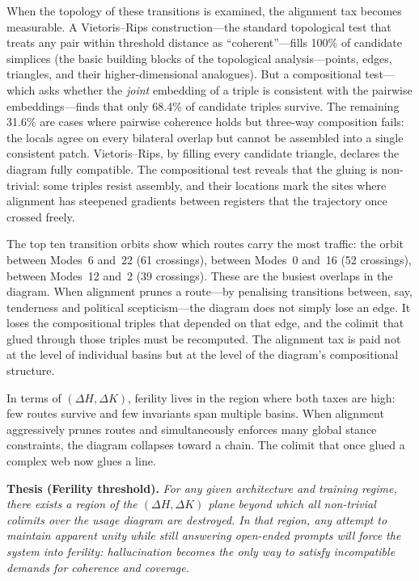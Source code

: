 When the topology of these transitions is examined, the alignment tax becomes measurable. A Vietoris--Rips construction---the standard topological test that treats any pair within threshold distance as ``coherent''---fills 100\% of candidate simplices (the basic building blocks of the topological analysis---points, edges, triangles, and their higher-dimensional analogues). But a compositional test---which asks whether the \emph{joint} embedding of a triple is consistent with the pairwise embeddings---finds that only 68.4\% of candidate triples survive. The remaining 31.6\% are cases where pairwise coherence holds but three-way composition fails: the locals agree on every bilateral overlap but cannot be assembled into a single consistent patch. Vietoris--Rips, by filling every candidate triangle, declares the diagram fully compatible. The compositional test reveals that the gluing is non-trivial: some triples resist assembly, and their locations mark the sites where alignment has steepened gradients between registers that the trajectory once crossed freely.

The top ten transition orbits show which routes carry the most traffic: the orbit between Modes~6 and~22 (61 crossings), between Modes~0 and~16 (52 crossings), between Modes~12 and~2 (39 crossings). These are the busiest overlaps in the diagram. When alignment prunes a route---by penalising transitions between, say, tenderness and political scepticism---the diagram does not simply lose an edge. It loses the compositional triples that depended on that edge, and the colimit that glued through those triples must be recomputed. The alignment tax is paid not at the level of individual basins but at the level of the diagram's compositional structure.

In terms of $(\Delta H, \Delta K)$, ferility lives in the region where both taxes are high: few routes survive and few invariants span multiple basins. When alignment aggressively prunes routes and simultaneously enforces many global stance constraints, the diagram collapses toward a chain. The colimit that once glued a complex web now glues a line.

\medskip
\noindent\textbf{Thesis (Ferility threshold).} \emph{For any given architecture and training regime, there exists a region of the $(\Delta H, \Delta K)$ plane beyond which all non-trivial colimits over the usage diagram are destroyed. In that region, any attempt to maintain apparent unity while still answering open-ended prompts will force the system into ferility: hallucination becomes the only way to satisfy incompatible demands for coherence and coverage.}
\medskip

